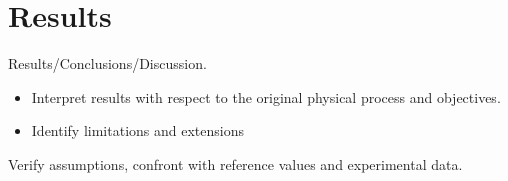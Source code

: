 \section{Results}
Results/Conclusions/Discussion.
\begin{itemize}
\item Interpret results with respect to the original physical process and objectives. 
\item Identify limitations and extensions
\end{itemize}
Verify assumptions, confront with reference values and experimental data.
